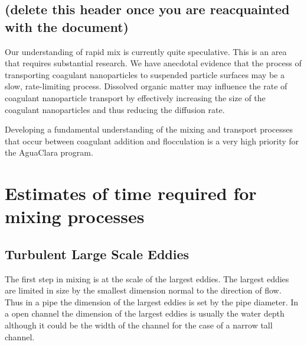 \documentclass[letterpaper,10pt,english]{sphinxmanual}
\begin{document}
\subsection{ (delete this header once you are reacquainted with the document)}
\label{\detokenize{Rapid_Mix/RM_Theory_and_Future_Work:previously-in-rapid-mix-intro-section-delete-this-header-once-you-are-reacquainted-with-the-document}}
Our understanding of rapid mix is currently quite speculative. This is an area that requires substantial research. We have anecdotal evidence that the process of transporting coagulant nanoparticles to suspended particle surfaces may be a slow, rate-limiting process. Dissolved organic matter may influence the rate of coagulant nanoparticle transport by effectively increasing the size of the coagulant nanoparticles and thus reducing the diffusion rate.

Developing a fundamental understanding of the mixing and transport processes that occur between coagulant addition and flocculation is a very high priority for the AguaClara program.


\section{Estimates of time required for mixing processes}
\label{\detokenize{Rapid_Mix/RM_Theory_and_Future_Work:estimates-of-time-required-for-mixing-processes}}\label{\detokenize{Rapid_Mix/RM_Theory_and_Future_Work:heading-estimates-of-time-required-for-mixing-processes}}

\subsection{Turbulent Large Scale Eddies}
\label{\detokenize{Rapid_Mix/RM_Theory_and_Future_Work:turbulent-large-scale-eddies}}\label{\detokenize{Rapid_Mix/RM_Theory_and_Future_Work:heading-turbulent-large-scale-eddies}}
The first step in mixing is at the scale of the largest eddies. The largest eddies are limited in size by the smallest dimension normal to the direction of flow. Thus in a pipe the dimension of the largest eddies is set by the pipe diameter. In a open channel the dimension of the largest eddies is usually the water depth although it could be the width of the channel for the case of a narrow tall channel.
\end{document}
